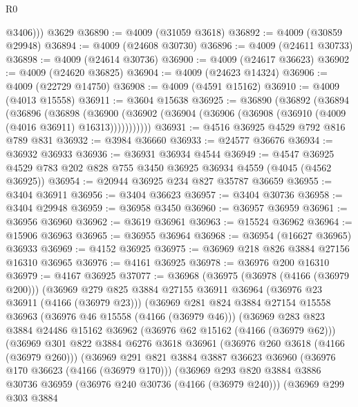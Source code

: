 \begin{lexlean}{R0}
\begin{coremodule}
          @3406)))
    @3629
@36890 := @4009 (@31059 @3618)
@36892 := @4009 (@30859 @29948)
@36894 := @4009 (@24608 @30730)
@36896 := @4009 (@24611 @30733)
@36898 := @4009 (@24614 @30736)
@36900 := @4009 (@24617 @36623)
@36902 := @4009 (@24620 @36825)
@36904 := @4009 (@24623 @14324)
@36906 := @4009 (@22729 @14750)
@36908 := @4009 (@4591 @15162)
@36910 := @4009 (@4013 @15558)
@36911 := @3604 @15638
@36925 := @36890
    (@36892
      (@36894
        (@36896
          (@36898
            (@36900 (@36902 (@36904 (@36906 (@36908 (@36910 (@4009 (@4016 @36911) @16313)))))))))))
@36931 := @4516 @36925 @4529 @792 @816 @789 @831
@36932 := @3984 @36660
@36933 := @24577 @36676
@36934 := @36932 @36933
@36936 := @36931 @36934 @4544
@36949 := @4547 @36925 @4529 @783 @202 @828 @755 @3450 @36925 @36934 @4559 (@4045 (@4562 @36925))
@36954 := @20944 @36925 @234 @827 @35787 @36659
@36955 := @3404 @36911
@36956 := @3404 @36623
@36957 := @3404 @30736
@36958 := @3404 @29948
@36959 := @36958 @3450
@36960 := @36957 @36959
@36961 := @36956 @36960
@36962 := @3619 @36961
@36963 := @15524 @36962
@36964 := @15906 @36963
@36965 := @36955 @36964
@36968 := @36954 (@16627 @36965) @36933
@36969 := @4152 @36925
@36975 := @36969 @218 @826 @3884 @27156 @16310 @36965
@36976 := @4161 @36925
@36978 := @36976 @200 @16310
@36979 := @4167 @36925
@37077 := @36968
    (@36975
      (@36978 (@4166 (@36979 @200)))
      (@36969
        @279
        @825
        @3884
        @27155
        @36911
        @36964
        (@36976 @23 @36911 (@4166 (@36979 @23)))
        (@36969
          @281
          @824
          @3884
          @27154
          @15558
          @36963
          (@36976 @46 @15558 (@4166 (@36979 @46)))
          (@36969
            @283
            @823
            @3884
            @24486
            @15162
            @36962
            (@36976 @62 @15162 (@4166 (@36979 @62)))
            (@36969
              @301
              @822
              @3884
              @6276
              @3618
              @36961
              (@36976 @260 @3618 (@4166 (@36979 @260)))
              (@36969
                @291
                @821
                @3884
                @3887
                @36623
                @36960
                (@36976 @170 @36623 (@4166 (@36979 @170)))
                (@36969
                  @293
                  @820
                  @3884
                  @3886
                  @30736
                  @36959
                  (@36976 @240 @30736 (@4166 (@36979 @240)))
                  (@36969
                    @299
                    @303
                    @3884

\end{coremodule}
\end{lexlean}

